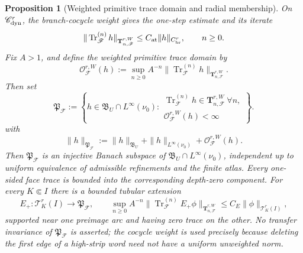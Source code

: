 \documentclass[11pt]{amsart}
\theoremstyle{compactplain}
\newtheorem{proposition}[theorem]{Proposition}
\theoremstyle{compactdefinition}
\theoremstyle{compactremark}
\begin{document}
\begin{proposition}[Weighted primitive trace domain and radial membership]
\label{prop:actual_trace_orbit_domain}
On \(\mathscr C_{\rm dyn}^r\), the branch-cocycle weight gives the one-step
estimate and its iterate
\begin{equation}
\label{eq:iterated_dynamic_trace_estimate}
 \|\operatorname{Tr}^{(n)}_{\mathscr F}h\|_{
       \mathbf T_{n,\mathscr F}^{r,W}}
 \le C_{\rm at}\|h\|_{C_{\rm br}^{r}},
 \qquad n\ge0.
\end{equation}
Fix \(A>1\), and define the weighted primitive trace domain by
\begin{equation}
\label{eq:actual_trace_orbit_norm}
 \mathcal O_{\mathscr F}^{r,W}(h)
 :=\sup_{n\ge0}A^{-n}
     \|\operatorname{Tr}^{(n)}_{\mathscr F}h\|_{
       \mathbf T_{n,\mathscr F}^{r,W}}.
\end{equation}
Then set
\begin{equation*}
 \mathfrak P_{\mathscr F}
 :=\left\{h\in\mathfrak B_U\cap L^\infty(\nu_0):
 \substack{\operatorname{Tr}^{(n)}_{\mathscr F}h\in
      \mathbf T_{n,\mathscr F}^{r,W}\ \forall n,\\
   \mathcal O_{\mathscr F}^{r,W}(h)<\infty}\right\}.
\end{equation*}
with
\begin{equation*}
 \|h\|_{\mathfrak P_{\mathscr F}}
 :=\|h\|_{\mathfrak B_U}+\|h\|_{L^\infty(\nu_0)}
   +\mathcal O_{\mathscr F}^{r,W}(h).
\end{equation*}
Then \(\mathfrak P_{\mathscr F}\) is an injective Banach subspace of
\(\mathfrak B_U\cap L^\infty(\nu_0)\), independent up to uniform equivalence
of admissible refinements and the finite atlas.  Every one-sided face trace is
bounded into the corresponding depth-zero component.  For every \(K\Subset I\)
there is a bounded tubular extension
\begin{equation}
\label{eq:weighted_tubular_extension}
 E_+:\mathcal T_K^r(I)\longrightarrow\mathfrak P_{\mathscr F},
 \qquad
 \sup_{n\ge0}A^{-n}
 \|\operatorname{Tr}^{(n)}_{\mathscr F}E_+\phi\|_{
       \mathbf T_{n,\mathscr F}^{r,W}}
 \le C_E\|\phi\|_{\mathcal T_K^r(I)},
\end{equation}
supported near one preimage arc and having zero trace on the other.  No
transfer invariance of \(\mathfrak P_{\mathscr F}\) is asserted; the cocycle
weight is used precisely because deleting the first edge of a high-strip word
need not have a uniform unweighted norm.


\end{proposition}
\end{document}
